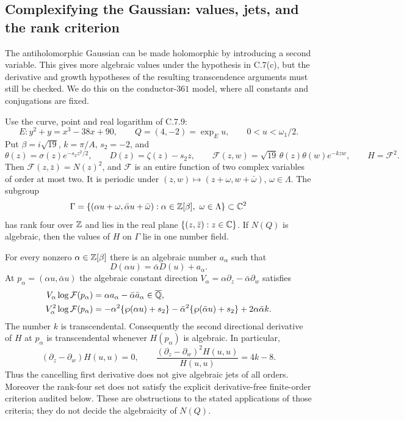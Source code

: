 \subsection{Complexifying the Gaussian: values, jets, and the rank criterion}

The antiholomorphic Gaussian can be made holomorphic by introducing a
second variable. This gives more algebraic values under the hypothesis
in C.7(c), but the derivative and growth hypotheses of the resulting
transcendence arguments must still be checked. We do this on the
conductor-$361$ model, where all constants and conjugations are fixed.

\begin{statement}
Use the curve, point and real logarithm of C.7.9:
\[
 E:y^2+y=x^3-38x+90,\qquad Q=(4,-2)=\exp_Eu,
 \qquad 0<u<\omega_1/2.
\]
Put $\beta=i\sqrt{19}$, $k=\pi/A$, $s_2=-2$, and
\[
 \theta(z)=\sigma(z)e^{-s_2z^2/2},\qquad
 D(z)=\zeta(z)-s_2z,\qquad
 \mathcal F(z,w)=\sqrt{19}\,\theta(z)\theta(w)e^{-kzw},
 \qquad H=\mathcal F^2.
\]
Then $\mathcal F(z,\bar z)=N(z)^2$, and $\mathcal F$ is an
entire function of two complex variables of order at most two.
It is periodic under $(z,w)\mapsto(z+\omega,w+\bar\omega)$,
$\omega\in\Lambda$. The subgroup
\[
 \Gamma=\{(\alpha u+\omega,\bar\alpha u+\bar\omega):
                   \alpha\in\mathbb Z[\beta],\ \omega\in\Lambda\}
 \subset\mathbb C^2
\]
has rank four over $\mathbb Z$ and lies in the real plane
$\{(z,\bar z):z\in\mathbb C\}$. If $N(Q)$ is algebraic, then the
values of $H$ on $\Gamma$ lie in one number field.

For every nonzero $\alpha\in\mathbb Z[\beta]$ there is an algebraic
number $a_\alpha$ such that
\[
 D(\alpha u)=\bar\alpha D(u)+a_\alpha.
\]
At $p_\alpha=(\alpha u,\bar\alpha u)$ the algebraic constant
direction $V_\alpha=\alpha\partial_z-\bar\alpha\partial_w$
satisfies
\begin{align*}
 V_\alpha\log\mathcal F(p_\alpha)
    &=\alpha a_\alpha-\bar\alpha\bar a_\alpha
                         \in\overline{\mathbb Q},\\
 V_\alpha^2\log\mathcal F(p_\alpha)
    &=-\alpha^2\{\wp(\alpha u)+s_2\}
      -\bar\alpha^2\{\wp(\bar\alpha u)+s_2\}
      +2\alpha\bar\alpha k.
\end{align*}
The number $k$ is transcendental. Consequently the second
directional derivative of $H$ at $p_\alpha$ is transcendental
whenever $H(p_\alpha)$ is algebraic. In particular,
\[
 (\partial_z-\partial_w)H(u,u)=0,\qquad
 \frac{(\partial_z-\partial_w)^2H(u,u)}{H(u,u)}=4k-8.
\]
Thus the cancelling first derivative does not give algebraic jets
of all orders. Moreover the rank-four set does not satisfy the
explicit derivative-free finite-order criterion audited below.
These are obstructions to the stated applications of those
criteria; they do not decide the algebraicity of $N(Q)$.
\end{statement}

